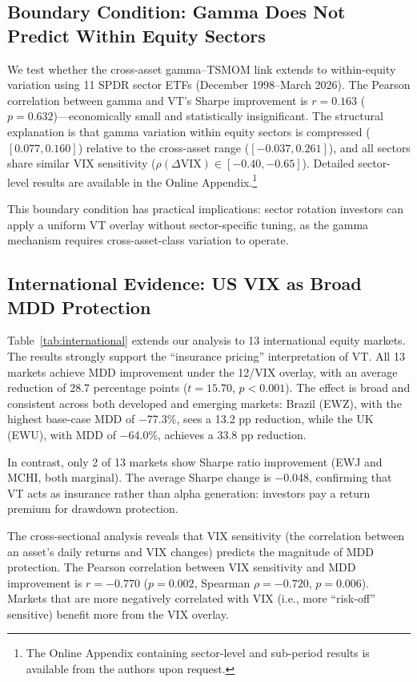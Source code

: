 \documentclass[12pt,a4paper]{article}
\begin{document}
\subsection{Boundary Condition: Gamma Does Not Predict Within Equity Sectors}

We test whether the cross-asset gamma--TSMOM link extends to within-equity variation using 11 SPDR sector ETFs (December 1998--March 2026). The Pearson correlation between gamma and VT's Sharpe improvement is $r = 0.163$ ($p = 0.632$)---economically small and statistically insignificant. The structural explanation is that gamma variation within equity sectors is compressed ($[0.077, 0.160]$) relative to the cross-asset range ($[-0.037, 0.261]$), and all sectors share similar VIX sensitivity ($\rho(\Delta\text{VIX}) \in [-0.40, -0.65]$). Detailed sector-level results are available in the Online Appendix.\footnote{The Online Appendix containing sector-level and sub-period results is available from the authors upon request.}

This boundary condition has practical implications: sector rotation investors can apply a uniform VT overlay without sector-specific tuning, as the gamma mechanism requires cross-asset-class variation to operate.


\subsection{International Evidence: US VIX as Broad MDD Protection}

Table~\ref{tab:international} extends our analysis to 13 international equity markets. The results strongly support the ``insurance pricing'' interpretation of VT. All 13 markets achieve MDD improvement under the 12/VIX overlay, with an average reduction of 28.7 percentage points ($t = 15.70$, $p < 0.001$). The effect is broad and consistent across both developed and emerging markets: Brazil (EWZ), with the highest base-case MDD of $-$77.3\%, sees a 13.2 pp reduction, while the UK (EWU), with MDD of $-$64.0\%, achieves a 33.8 pp reduction.

In contrast, only 2 of 13 markets show Sharpe ratio improvement (EWJ and MCHI, both marginal). The average Sharpe change is $-$0.048, confirming that VT acts as insurance rather than alpha generation: investors pay a return premium for drawdown protection.

The cross-sectional analysis reveals that VIX sensitivity (the correlation between an asset's daily returns and VIX changes) predicts the magnitude of MDD protection. The Pearson correlation between VIX sensitivity and MDD improvement is $r = -0.770$ ($p = 0.002$, Spearman $\rho = -0.720$, $p = 0.006$). Markets that are more negatively correlated with VIX (i.e., more ``risk-off'' sensitive) benefit more from the VIX overlay.
\end{document}
